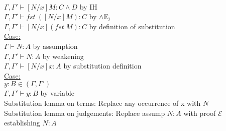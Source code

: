   \\ $\Gamma, \Gamma ' \vdash [N/x] M : C\land D$ by IH
  \\ $\Gamma, \Gamma ' \vdash fst\ ([N/x]M) : C$ by $\land$E$_l$
  \\$\Gamma, \Gamma' \vdash [N/x](fst \ M) : C$ by definition of substitution
\\ \underline{Case:} 
  \\ $\Gamma \vdash N:A$ by assumption
  \\ $\Gamma, \Gamma' \vdash N : A$ by weakening
  \\ $\Gamma, \Gamma' \vdash [N/x]x : A$ by substitution definition
  \\ \underline{Case:} 
    \\ $y:B \in (\Gamma, \Gamma')$
    \\ $\Gamma, \Gamma' \vdash y : B$ by variable
\\ Substitution lemma on terms: Replace any occurrence of x with $N$
\\ Substitution lemma on judgements: Replace assump $N:A$ with proof
$\mathcal{E}$ establishing $N:A$
\color{OliveGreen}
